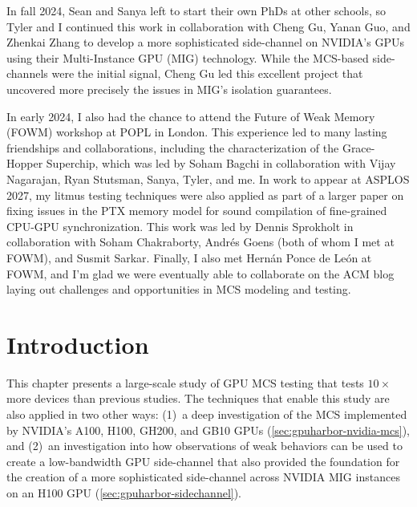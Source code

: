 In fall 2024, Sean and Sanya left to start their own PhDs at other schools, so Tyler and I continued this work in collaboration with Cheng Gu, Yanan Guo, and Zhenkai Zhang to develop a more sophisticated side-channel on NVIDIA's GPUs using their Multi-Instance GPU (MIG) technology. While the MCS-based side-channels were the initial signal, Cheng Gu led this excellent project that uncovered more precisely the issues in MIG's isolation guarantees.

In early 2024, I also had the chance to attend the Future of Weak Memory (FOWM) workshop at POPL in London. This experience led to many lasting friendships and collaborations, including the characterization of the Grace-Hopper Superchip, which was led by Soham Bagchi in collaboration with Vijay Nagarajan, Ryan Stutsman, Sanya, Tyler, and me. In work to appear at ASPLOS 2027, my litmus testing techniques were also applied as part of a larger paper on fixing issues in the PTX memory model for sound compilation of fine-grained CPU-GPU synchronization. This work was led by Dennis Sprokholt in collaboration with Soham Chakraborty, Andr\'es Goens (both of whom I met at FOWM), and Susmit Sarkar. Finally, I also met Hern\'an Ponce de Le\'on at FOWM, and I'm glad we were eventually able to collaborate on the ACM blog laying out challenges and opportunities in MCS modeling and testing.

\section{Introduction}

This chapter presents a large-scale study of GPU MCS testing that tests $10\times$ more devices than previous studies. The techniques that enable this study are also applied in two other ways: (1)~a deep investigation of the MCS implemented by NVIDIA's A100, H100, GH200, and GB10 GPUs (\mysec\ref{sec:gpuharbor-nvidia-mcs}), and (2)~an investigation into how observations of weak behaviors can be used to create a low-bandwidth GPU side-channel that also provided the foundation for the creation of a more sophisticated side-channel across NVIDIA MIG instances on an H100 GPU (\mysec\ref{sec:gpuharbor-sidechannel}).

